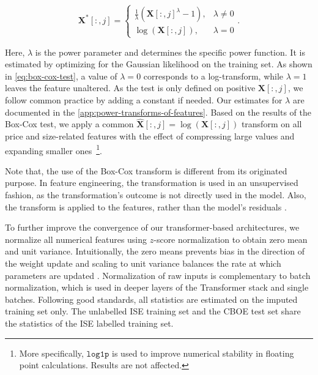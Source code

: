 \begin{equation}
    \mathbf{X}^{*}\left[:,j\right]= \begin{cases}\frac{1}{\lambda}(\mathbf{X}\left[:,j\right]^\lambda-1), & \lambda \neq 0 \\ \log (\mathbf{X}\left[:,j\right]),& \lambda=0\end{cases}.
    \label{eq:box-cox-test}
\end{equation}

Here, $\lambda$ is the power parameter and determines the specific power function. It is estimated by optimizing for the Gaussian likelihood on the training set. As shown in \cref{eq:box-cox-test}, a value of $\lambda=0$ corresponds to a log-transform, while $\lambda=1$ leaves the feature unaltered. As the test is only defined on positive $\mathbf{X}\left[:,j\right]$, we follow common practice by adding a constant if needed. Our estimates for $\lambda$ are documented in the \cref{app:power-transforms-of-features}. Based on the results of the Box-Cox test, we apply a common $\widehat{\mathbf{X}}\left[:,j\right]=\log(\mathbf{X}\left[:,j\right])$ transform on all price and size-related features with the effect of compressing large values and expanding smaller ones~\footnote{More specifically, $\mathtt{log1p}$ is used to improve numerical stability in floating point calculations. Results are not affected.}.

Note that, the use of the Box-Cox transform is different from its originated purpose. In feature engineering, the transformation is used in an unsupervised fashion, as the transformation's outcome is not directly used in the model. Also, the transform is applied to the features, rather than the model's residuals \autocite[122]{kuhnFeatureEngineeringSelection2020}.

To further improve the convergence of our transformer-based architectures, we normalize all numerical features using $z$-score normalization to obtain zero mean and unit variance.
Intuitionally, the zero means prevents bias in the direction of the weight update and scaling to unit variance balances the rate at which parameters are updated \autocite[][8]{lecunEfficientBackProp2012}. Normalization of raw inputs is complementary to batch normalization, which is used in deeper layers of the Transformer stack and single batches. Following good standards, all statistics are estimated on the imputed training set only. The unlabelled \gls{ISE} training set and the \gls{CBOE} test set share the statistics of the \gls{ISE} labelled training set.

